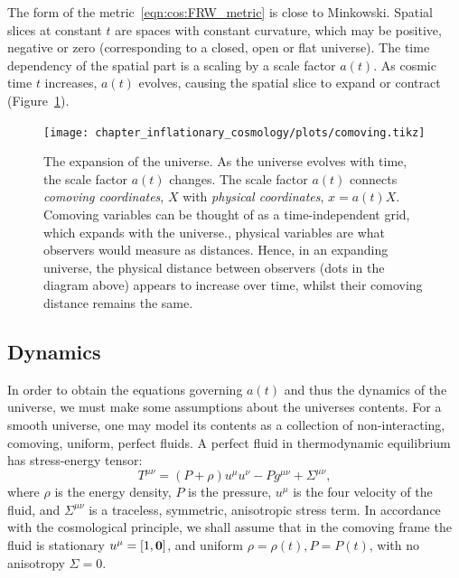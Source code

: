 The form of the metric~\eqref{eqn:cos:FRW_metric} is close to Minkowski. Spatial slices at constant $t$ are spaces with constant curvature, which may be positive, negative or zero (corresponding to a closed, open or flat universe). The time dependency of the spatial part is a scaling by a scale factor $a(t)$. As cosmic time $t$ increases, $a(t)$ evolves, causing the spatial slice to expand or contract (Figure~\ref{fig:cos:comoving_vs_physical}). 



\begin{figure}
  \centering
  \texttt{[image: chapter\_inflationary\_cosmology/plots/comoving.tikz]}
  \caption{The expansion of the universe. As the universe evolves with time, the scale factor $a(t)$ changes. The scale factor $a(t)$ connects {\em comoving coordinates}, $X$ with {\em physical coordinates}, $x=a(t)X$. Comoving variables can be thought of as a time-independent grid, which expands with the universe.\label{fig:cos:comoving_vs_physical}, physical variables are what observers would measure as distances. Hence, in an expanding universe, the physical distance between observers (dots in the diagram above) appears to increase over time, whilst their comoving distance remains the same.}
\end{figure}


\subsection{Dynamics}
In order to obtain the equations governing $a(t)$ and thus the dynamics of the universe, we must make some assumptions about the universes contents. For a smooth universe, one may model its contents as a collection of non-interacting, comoving, uniform, perfect fluids. A perfect fluid in thermodynamic equilibrium has stress-energy tensor:
\begin{equation}
  T^{\mu\nu} = (P+\rho)u^{\mu}u^{\nu} - P g^{\mu\nu} + \Sigma^{\mu\nu},
  \label{eqn:cos:SET_perfect_fluid}
\end{equation}
where $\rho$ is the energy density, $P$ is the pressure, $u^\mu$ is the four velocity of the fluid, and $\Sigma^{\mu\nu}$ is a traceless, symmetric, anisotropic stress term. In accordance with the cosmological principle, we shall assume that in the comoving frame the fluid is stationary $u^\mu = [1,\mathbf{0}]$, and uniform $\rho=\rho(t),P=P(t)$, with no anisotropy $\Sigma=0$.  

